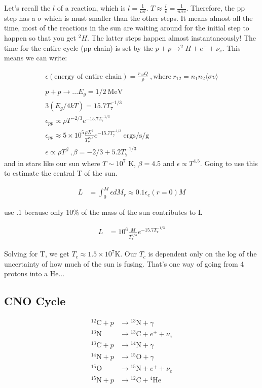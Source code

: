 Let's recall the $l$ of a reaction, which is $l=\frac{1}{n\sigma}$. $T \approx \frac{l}{v} = \frac{1}{n \sigma v}$. Therefore, the pp step has a $\sigma$ which is must smaller than the other steps. It means almost all the time, most of the reactions in the sun are waiting around for the initial step to happen so that you get $^2H$. The latter steps happen almost instantaneously! The time for the entire cycle (pp chain) is set by the $p + p \rightarrow ^2H + e^+ + \nu_e$. This means we can write:

\begin{align}
\epsilon (\text{energy of entire chain}) = \frac{r_{12} Q}{ \rho} ~,\text{where}~ r_{12}= n_1n_2\langle \sigma v\rangle \\
\\
p + p \rightarrow ... E_g = 1/2 ~\text{MeV}\\
3 (E_g/4kT) = 15.7T_7^{-1/3}\\
\epsilon_{pp}  \propto \rho T^{-2/3} e^{-15.7 T_7^{-1/3}}\\
\epsilon_{pp}  \approx 5 \times 10^5 \frac{\rho X^2}{T_7^{2/3}}e^{-15.7 T_7^{-1/3}}~\text{ergs/s/g}\\
\epsilon \propto \rho T^\beta~,\beta = -2/3 + 5.2T_7^{-1/3}
\end{align}
and in stars like our sun where $T \sim 10^7$ K, $\beta = 4.5$ and $\epsilon \propto T^{4.5}$. Going to use this to estimate the central T of the sun. 

\begin{align}
L &= \int_0^M \epsilon dM_r \approx 0.1 \epsilon_c(r=0)M
\end{align}

use .1 because only 10\% of the mass of the sun contributes to L

\begin{align}
L &= 10^6 \frac{M}{T_7^{2/3}}e^{-15.7T_7^{-1/3}}
\end{align}

Solving for T, we get $T_c \approx 1.5 \times 10^7$K. Our $T_c$ is dependent only on the log of the uncertainty of how much of the sun is fusing. That's one way of going from 4 protons into a He...

\subsection{CNO Cycle}

\begin{align}
\textrm{$^{12}$C}+ p & \rightarrow \textrm{$^{13}$N} + \gamma \\
\textrm{$^{13}$N} & \rightarrow \textrm{$^{13}$C} + e^+ + \nu_e\\
\textrm{$^{13}$C} + p  & \rightarrow \textrm{$^{14}$N} + \gamma\\
\textrm{$^{14}$N} + p & \rightarrow \textrm{$^{15}$O} + \gamma\\
\textrm{$^{15}$O} & \rightarrow \textrm{$^{15}$N} + e^+ + \nu_e\\
\textrm{$^{15}$N}+ p & \rightarrow \textrm{$^{12}$C} + \textrm{$^{4}$He}
\end{align}

